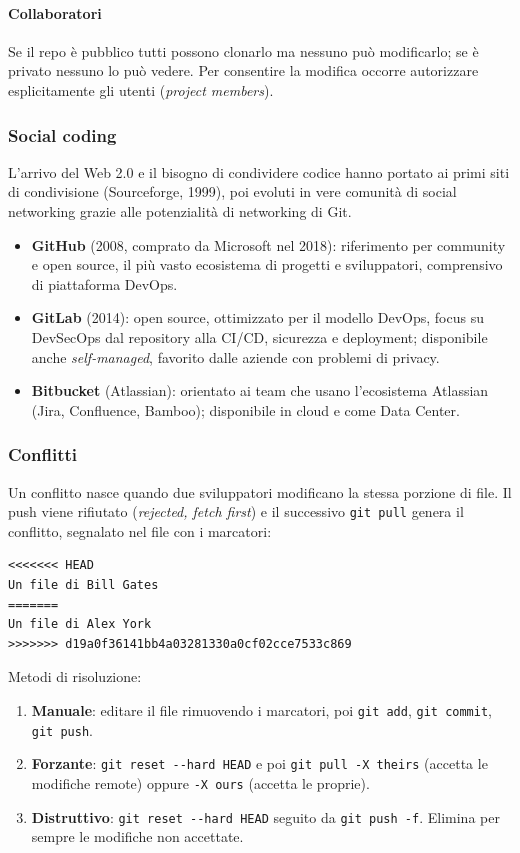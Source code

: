 \documentclass[a4paper,12pt]{article}
\begin{document}
\paragraph{Collaboratori} Se il repo è pubblico tutti possono clonarlo ma nessuno può
modificarlo; se è privato nessuno lo può vedere. Per consentire la modifica occorre
autorizzare esplicitamente gli utenti (\emph{project members}).

\subsubsection{Social coding}

L'arrivo del Web 2.0 e il bisogno di condividere codice hanno portato ai primi siti di
condivisione (Sourceforge, 1999), poi evoluti in vere comunità di social networking
grazie alle potenzialità di networking di Git.

\begin{itemize}
  \item \textbf{GitHub} (2008, comprato da Microsoft nel 2018): riferimento per community
        e open source, il più vasto ecosistema di progetti e sviluppatori, comprensivo di
        piattaforma DevOps.
  \item \textbf{GitLab} (2014): open source, ottimizzato per il modello DevOps, focus su
        DevSecOps dal repository alla CI/CD, sicurezza e deployment; disponibile anche
        \emph{self-managed}, favorito dalle aziende con problemi di privacy.
  \item \textbf{Bitbucket} (Atlassian): orientato ai team che usano l'ecosistema
        Atlassian (Jira, Confluence, Bamboo); disponibile in cloud e come Data Center.
\end{itemize}

\subsubsection{Conflitti}

Un conflitto nasce quando due sviluppatori modificano la stessa porzione di file. Il
push viene rifiutato (\emph{rejected, fetch first}) e il successivo \verb|git pull|
genera il conflitto, segnalato nel file con i marcatori:

\begin{verbatim}
<<<<<<< HEAD
Un file di Bill Gates
=======
Un file di Alex York
>>>>>>> d19a0f36141bb4a03281330a0cf02cce7533c869
\end{verbatim}

Metodi di risoluzione:
\begin{enumerate}
  \item \textbf{Manuale}: editare il file rimuovendo i marcatori, poi \verb|git add|,
        \verb|git commit|, \verb|git push|.
  \item \textbf{Forzante}: \verb|git reset --hard HEAD| e poi
        \verb|git pull -X theirs| (accetta le modifiche remote) oppure
        \verb|-X ours| (accetta le proprie).
  \item \textbf{Distruttivo}: \verb|git reset --hard HEAD| seguito da
        \verb|git push -f|. Elimina per sempre le modifiche non accettate.
\end{enumerate}
\end{document}
